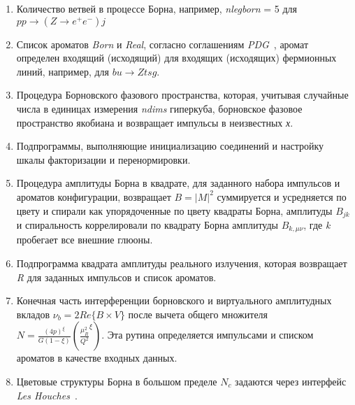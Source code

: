 \begin{enumerate}
	\item Количество ветвей в процессе Борна, например, \textit{nlegborn} = 5 для $pp \rightarrow (Z \rightarrow {e}^{+}{e}^{-}) j$
	\item Список ароматов \textit{Born} и \textit{Real}, согласно соглашениям \textit{PDG}~\cite{review-powheg}, аромат
	определен входящий (исходящий) для входящих (исходящих) фермионных линий, например, для $bu \rightarrow Ztsg$.
	\item Процедура Борновского фазового пространства, которая, учитывая случайные числа в единицах измерения \textit{ndims}
	гиперкуба, борновское фазовое пространство якобиана и возвращает импульсы в неизвестных \textit{х}.
	\item Подпрограммы, выполняющие инициализацию соединений и настройку
	шкалы факторизации и перенормировки.
	\item Процедура амплитуды Борна в квадрате, для заданного набора импульсов и ароматов
	конфигурации, возвращает $B = {|M|}^{2}$
	суммируется и усредняется по цвету и спирали
	как упорядоченные по цвету квадраты Борна, амплитуды ${B}_{jk}$ и спиральность коррелировали по квадрату Борна
	амплитуды ${B}_{k,\mu\nu}$, где \textit{k} пробегает все внешние глюоны.
	\item Подпрограмма квадрата амплитуды реального излучения, которая возвращает \textit{R} для заданных импульсов и
	список ароматов.
	\item Конечная часть интерференции борновского и виртуального амплитудных вкладов ${\nu}_{b} = 2Re\{B\times V\}$ после вычета общего множителя $N = \frac{{(4p)}^\xi}{G(1-\xi)}({\frac{{\mu}_{R}^{2}}{{Q}^{2}}}^{\xi})$. Эта рутина определяется импульсами и списком ароматов в качестве входных данных.
	\item Цветовые структуры Борна в большом пределе ${N}_{c}$ задаются через интерфейс \textit{Les Houches}~\cite{review-powheg}.
\end{enumerate}

